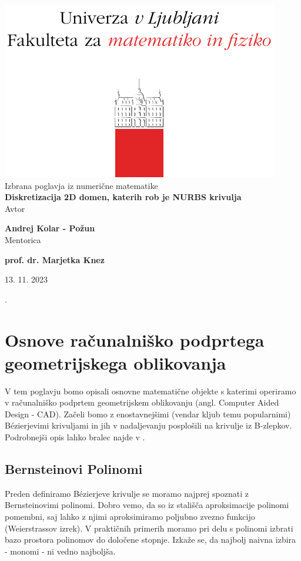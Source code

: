 \documentclass{article}
\begin{document}
\begin{titlepage}
    \begin{center}
        \vspace*{1cm}
        \Large
\includegraphics[width=.4\linewidth]{slike/logo.pdf}\\
        \Large
\vspace{1cm}
        Izbrana poglavja iz numerične matematike\\
        \huge
        \textbf{Diskretizacija 2D domen, katerih rob je NURBS krivulja\\}
\Large  
        \vspace{1cm}
		Avtor

        \textbf{Andrej Kolar - Po{\v z}un\\}
        \vspace{0.5cm}
	 	Mentorica

	  \textbf{prof. dr. Marjetka Knez}

        \vspace{0.8cm}
 13. 11. 2023

\vfill
\normalsize
\end{center}. 
\end{titlepage}
\newpage
{}

\section{Osnove računalniško podprtega geometrijskega oblikovanja}

V tem poglavju bomo opisali osnovne matematične objekte s katerimi operiramo v računalniško podprtem geometrijskem oblikovanju (angl. Computer Aided Design - CAD).
Začeli bomo z enostavnejšimi (vendar kljub temu popularnimi) Bézierjevimi krivuljami in jih v nadaljevanju posplošili na krivulje iz B-zlepkov.
Podrobnejši opis lahko bralec najde v \cite{iso1,iso2,pres}.
\subsection{Bernsteinovi Polinomi}
Preden definiramo Bézierjeve krivulje se moramo najprej spoznati z Bernsteinovimi polinomi.
Dobro vemo, da so iz stališča aproksimacije polinomi pomembni, saj lahko z njimi aproksimiramo poljubno zvezno funkcijo (Weierstrassov izrek). V praktičnih primerih moramo pri delu s polinomi izbrati bazo prostora polinomov do določene stopnje. Izkaže se, da najbolj naivna izbira - monomi - ni vedno najboljša. 
\end{document}
